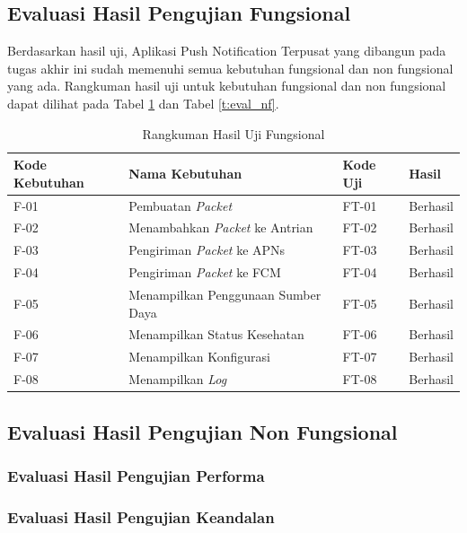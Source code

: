 \subsection{Evaluasi Hasil Pengujian Fungsional}
\par Berdasarkan hasil uji, Aplikasi Push Notification Terpusat yang dibangun pada tugas akhir ini sudah memenuhi semua kebutuhan fungsional dan non fungsional yang ada. Rangkuman hasil uji untuk kebutuhan fungsional dan non fungsional dapat dilihat pada Tabel \ref{t:eval_f} dan Tabel \ref{t:eval_nf}.
\begin{longtable}{|p{1.5cm}|p{3cm}|p{1.5cm}|p{1.5cm}|}
	\caption{Rangkuman Hasil Uji Fungsional} \label{t:eval_f} \\ \hline
	\rowcolor{lightgray} Kode Kebutuhan & Nama Kebutuhan & Kode Uji & Hasil \\ \hline
	F-01 & Pembuatan \textit{Packet} & FT-01 & Berhasil \\ \hline
	F-02 & Menambahkan \textit{Packet} ke Antrian & FT-02 & Berhasil \\ \hline
	F-03 & Pengiriman \textit{Packet} ke APNs & FT-03 & Berhasil \\ \hline
	F-04 & Pengiriman \textit{Packet} ke FCM & FT-04 & Berhasil \\ \hline
	F-05 & Menampilkan Penggunaan Sumber Daya & FT-05 & Berhasil \\ \hline
	F-06 & Menampilkan Status Kesehatan & FT-06 & Berhasil \\ \hline
	F-07 & Menampilkan Konfigurasi & FT-07 & Berhasil \\ \hline
	F-08 & Menampilkan \textit{Log} & FT-08 & Berhasil \\ \hline
\end{longtable}

\subsection{Evaluasi Hasil Pengujian Non Fungsional}

\subsubsection{Evaluasi Hasil Pengujian Performa}

\subsubsection{Evaluasi Hasil Pengujian Keandalan}

